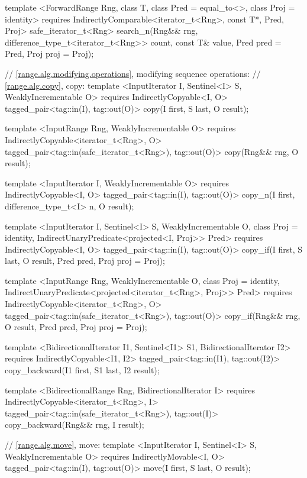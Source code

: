{\begin{codeblock}
{{    template <ForwardRange Rng, class T, class Pred = equal_to<>,
        class Proj = identity>
      requires IndirectlyComparable<iterator_t<Rng>, const T*, Pred, Proj>
      safe_iterator_t<Rng>
        search_n(Rng&& rng, difference_type_t<iterator_t<Rng>> count,
                const T& value, Pred pred = Pred{}, Proj proj = Proj{});

    // \ref{range.alg.modifying.operations}, modifying sequence operations:
    // \ref{range.alg.copy}, copy:
    template <InputIterator I, Sentinel<I> S, WeaklyIncrementable O>
      requires IndirectlyCopyable<I, O>
      tagged_pair<tag::in(I), tag::out(O)>
        copy(I first, S last, O result);

    template <InputRange Rng, WeaklyIncrementable O>
      requires IndirectlyCopyable<iterator_t<Rng>, O>
      tagged_pair<tag::in(safe_iterator_t<Rng>), tag::out(O)>
        copy(Rng&& rng, O result);

    template <InputIterator I, WeaklyIncrementable O>
      requires IndirectlyCopyable<I, O>
      tagged_pair<tag::in(I), tag::out(O)>
        copy_n(I first, difference_type_t<I> n, O result);

    template <InputIterator I, Sentinel<I> S, WeaklyIncrementable O, class Proj = identity,
        IndirectUnaryPredicate<projected<I, Proj>> Pred>
      requires IndirectlyCopyable<I, O>
      tagged_pair<tag::in(I), tag::out(O)>
        copy_if(I first, S last, O result, Pred pred, Proj proj = Proj{});

    template <InputRange Rng, WeaklyIncrementable O, class Proj = identity,
        IndirectUnaryPredicate<projected<iterator_t<Rng>, Proj>> Pred>
      requires IndirectlyCopyable<iterator_t<Rng>, O>
      tagged_pair<tag::in(safe_iterator_t<Rng>), tag::out(O)>
        copy_if(Rng&& rng, O result, Pred pred, Proj proj = Proj{});

    template <BidirectionalIterator I1, Sentinel<I1> S1, BidirectionalIterator I2>
      requires IndirectlyCopyable<I1, I2>
      tagged_pair<tag::in(I1), tag::out(I2)>
        copy_backward(I1 first, S1 last, I2 result);

    template <BidirectionalRange Rng, BidirectionalIterator I>
      requires IndirectlyCopyable<iterator_t<Rng>, I>
      tagged_pair<tag::in(safe_iterator_t<Rng>), tag::out(I)>
        copy_backward(Rng&& rng, I result);

    // \ref{range.alg.move}, move:
    template <InputIterator I, Sentinel<I> S, WeaklyIncrementable O>
      requires IndirectlyMovable<I, O>
      tagged_pair<tag::in(I), tag::out(O)>
        move(I first, S last, O result);

}}
\end{codeblock}}
